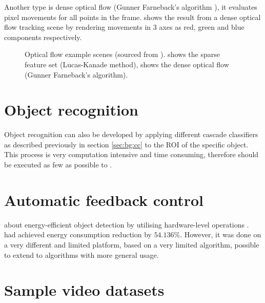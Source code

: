 Another type is dense optical flow (Gunner Farneback's algorithm \cite{farneback2003two}), it evaluates pixel movements for all points in the frame.  shows the result from a dense optical flow tracking scene by rendering movements in 3 axes as red, green and blue components respectively.

\begin{figure}[H]
  \centering
  \caption{Optical flow example scenes (sourced from \cite{opencv:of}).  shows the sparse feature set (Lucas-Kanade method),  shows the dense optical flow (Gunner Farneback's algorithm).}
  \label{bg:of}
\end{figure}



\section{Object recognition}

Object recognition can also be developed by applying different cascade classifiers as described previously in section \ref{sec:bg:cc} to the ROI of the specific object. This process is very computation intensive and time consuming, therefore should be executed as few as possible to . 

\section{Automatic feedback control}

 about energy-efficient object detection by utilising hardware-level operations \cite{casares2011energy}.  had achieved energy consumption reduction by $54.136\%$. However, it was done on a very different and limited platform, based on a very limited algorithm, possible to extend to algorithms with more general usage.

\section{Sample video datasets}

